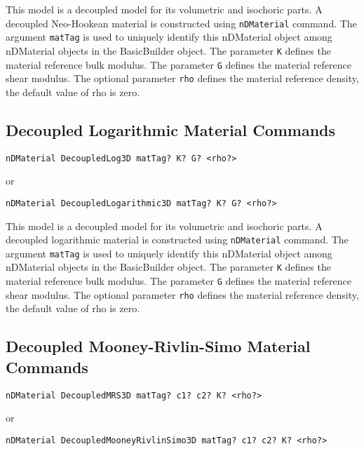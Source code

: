 This model is a decoupled model for its volumetric and isochoric parts.
A decoupled Neo-Hookean material is constructed using \texttt{nDMaterial} command.
The argument \texttt{matTag} is used to uniquely identify this nDMaterial object among 
nDMaterial objects in the BasicBuilder object. 
The parameter \texttt{K} defines the material reference bulk modulus. 
The parameter \texttt{G} defines the material reference shear modulus. 
The optional parameter \texttt{rho} defines the material reference density, 
the default value of rho is zero.  


\subsection{Decoupled Logarithmic Material Commands}
\label{DLog}

\begin{verbatim}
nDMaterial DecoupledLog3D matTag? K? G? <rho?> 
\end{verbatim}
or
\begin{verbatim}
nDMaterial DecoupledLogarithmic3D matTag? K? G? <rho?> 
\end{verbatim}

This model is a decoupled model for its volumetric and isochoric parts.
A decoupled logarithmic material is constructed using \texttt{nDMaterial} command.
The argument \texttt{matTag} is used to uniquely identify this nDMaterial object among 
nDMaterial objects in the BasicBuilder object. 
The parameter \texttt{K} defines the material reference bulk modulus. 
The parameter \texttt{G} defines the material reference shear modulus. 
The optional parameter \texttt{rho} defines the material reference density, 
the default value of rho is zero. 


\subsection{Decoupled Mooney-Rivlin-Simo Material Commands}
\label{DMRS}

\begin{verbatim}
nDMaterial DecoupledMRS3D matTag? c1? c2? K? <rho?> 
\end{verbatim}
or
\begin{verbatim}
nDMaterial DecoupledMooneyRivlinSimo3D matTag? c1? c2? K? <rho?> 
\end{verbatim}


